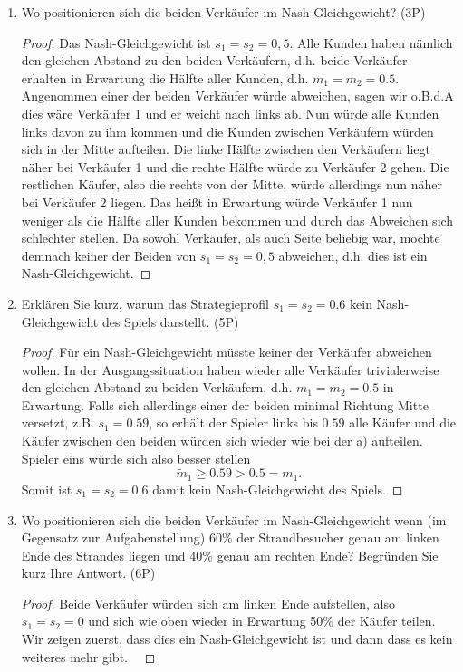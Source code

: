 \documentclass[12pt]{article}
\begin{document}
\begin{enumerate}[label=\alph*\upshape)]
	\item Wo positionieren sich die beiden Verkäufer im Nash-Gleichgewicht? (3P)
		\begin{proof}
			Das Nash-Gleichgewicht ist $s_1 = s_2 = 0,5$. Alle Kunden haben nämlich den gleichen Abstand zu den beiden Verkäufern, d.h. beide Verkäufer erhalten in Erwartung die Hälfte aller Kunden, d.h. $m_1 = m_2 = 0.5$. Angenommen einer der beiden Verkäufer würde abweichen, sagen wir o.B.d.A dies wäre Verkäufer 1 und er weicht nach links ab. Nun würde alle Kunden links davon zu ihm kommen und die Kunden zwischen Verkäufern würden sich in der Mitte aufteilen. Die linke Hälfte zwischen den Verkäufern liegt näher bei Verkäufer 1 und die rechte Hälfte würde zu Verkäufer 2 gehen. Die restlichen Käufer, also die rechts von der Mitte, würde allerdings nun näher bei Verkäufer 2 liegen. Das heißt in Erwartung würde Verkäufer 1 nun weniger als die Hälfte aller Kunden bekommen und durch das Abweichen sich schlechter stellen. Da sowohl Verkäufer, als auch Seite beliebig war, möchte demnach keiner der Beiden von $s_1 = s_2 = 0,5$ abweichen, d.h. dies ist ein Nash-Gleichgewicht.
		\end{proof}
	\item Erklären Sie kurz, warum das Strategieprofil $s_1 = s_2 = 0.6$ kein Nash-Gleichgewicht des Spiels darstellt. (5P)
		\begin{proof}
			Für ein Nash-Gleichgewicht müsste keiner der Verkäufer abweichen wollen. In der Ausgangssituation haben wieder alle Verkäufer trivialerweise den gleichen Abstand zu beiden Verkäufern, d.h. $m_1 = m_2 = 0.5$ in Erwartung. Falls sich allerdings einer der beiden minimal Richtung Mitte versetzt, z.B. $s_1 = 0.59$, so erhält der Spieler links bis $0.59$ alle Käufer und die Käufer zwischen den beiden würden sich wieder wie bei der a) aufteilen. Spieler eins würde sich also besser stellen 
			$$ \tilde{m}_1 \geq 0.59 > 0.5 = m_1. $$
			Somit ist $s_1 = s_2 = 0.6$ damit kein Nash-Gleichgewicht des Spiels.
		\end{proof}
	\item Wo positionieren sich die beiden Verkäufer im Nash-Gleichgewicht wenn (im Gegensatz zur Aufgabenstellung) 60\% der Strandbesucher genau am linken Ende des Strandes liegen und 40\% genau am rechten Ende? Begründen Sie kurz Ihre Antwort. (6P)
		\begin{proof}
			Beide Verkäufer würden sich am linken Ende aufstellen, also $s_1 = s_2 = 0$ und sich wie oben wieder in Erwartung 50\% der Käufer teilen. Wir zeigen zuerst, dass dies ein Nash-Gleichgewicht ist und dann dass es kein weiteres mehr gibt. ~\smallskip
			

\end{proof}
\end{enumerate}
\end{document}
